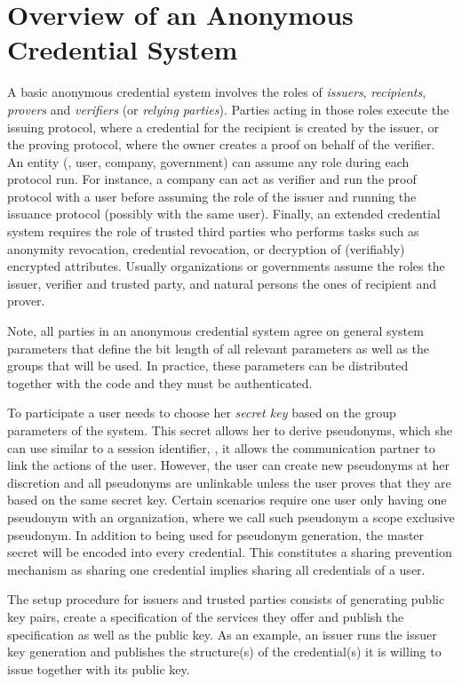 
\section{Overview of an Anonymous Credential System}
\label{sec:credSysOverview}

A basic anonymous credential system involves the roles of \emph{issuers}, \emph{recipients},
\emph{provers} and \emph{verifiers} (or \emph{relying parties}).
Parties acting in those roles execute the issuing protocol, where a credential for the
recipient is created by the issuer, or the proving protocol, where the owner creates a proof
on behalf of the verifier. 
An entity (\eg, user, company, government) can assume any role during each protocol run. 
For instance, a company can act as verifier and run the proof protocol with a user before
assuming the role of the issuer and running the issuance protocol (possibly with the same
user). 
Finally, an extended credential system requires the role of trusted third parties who 
performs tasks such as anonymity revocation, credential revocation, or decryption
of (verifiably) encrypted attributes.
Usually organizations or governments assume the roles the issuer, verifier and trusted party,
and natural persons the ones of recipient and prover.

Note, all parties in an anonymous credential system agree on general system parameters that
define the bit length of all relevant parameters as well as the groups that will be used. 
In practice, these parameters can be distributed together with the code and they must be 
authenticated.

To participate a user needs to choose her \emph{secret key} based on the group
parameters of the system.
This secret allows her to derive pseudonyms, which she can use similar to a session
identifier, \ie, it allows the communication partner to link the actions of the user.
However, the user can create new pseudonyms at her discretion and all pseudonyms are
unlinkable unless the user proves that they are based on the same secret key.
Certain scenarios require one user only having one pseudonym with an organization,
where we call such pseudonym a scope exclusive pseudonym.
In addition to being used for pseudonym generation, the master secret will be encoded into
every credential.
This constitutes a sharing prevention mechanism as sharing one credential implies sharing all
credentials of a user.

The setup procedure for issuers and trusted parties consists of generating public key pairs,
create a specification of the services they offer and publish the specification as well as the
public key.
As an example, an issuer runs the issuer key generation and publishes the structure(s) of the
credential(s) it is willing to issue together with its public key.

